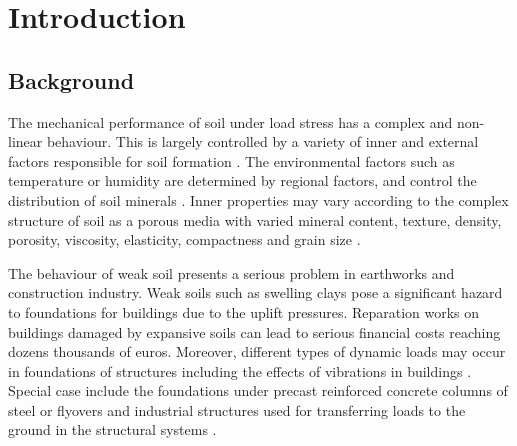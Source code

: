 \documentclass[USenglish,twocolumn]{article}
\begin{document}



  
\maketitle

\section{Introduction}

\subsection{Background}

The mechanical performance of soil under load stress has a complex and non-linear behaviour. This is largely controlled by a variety of inner and external factors responsible for soil formation \cite{Jenny,Buol,Winterkorn1991a}. The environmental factors such as temperature or humidity are determined by regional factors, and control the distribution of soil minerals \cite{Righi1995,Nesse}. Inner properties may vary according to the complex structure of soil as a porous media with varied mineral content, texture, density, porosity, viscosity, elasticity, compactness and grain size \cite{Kaellenetal2014,Kallenetal2016}. 

The behaviour of weak soil presents a serious problem in earthworks and construction industry. Weak  soils such as swelling clays pose a significant hazard to foundations for buildings due to the uplift pressures. Reparation works on buildings damaged by expansive soils can lead to serious financial costs reaching dozens thousands of euros. Moreover, different types of dynamic loads may occur in foundations of structures including the effects of vibrations in buildings \cite{GOLEWSKI20214344}. Special case include the foundations under precast reinforced concrete columns of steel or flyovers and industrial structures used for transferring loads to the ground in the structural systems \cite{NASCIMBENE2021113214,buildings12020192}. 
\end{document}
